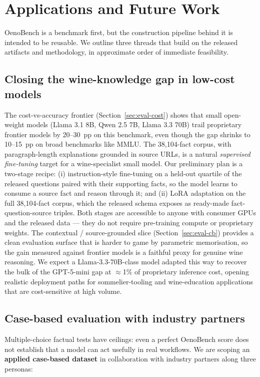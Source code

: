 \section{Applications and Future Work}
\label{sec:future}

OenoBench is a benchmark first, but the construction pipeline behind it
is intended to be reusable. We outline three threads that build on the
released artifacts and methodology, in approximate order of immediate
feasibility.

\subsection{Closing the wine-knowledge gap in low-cost models}
The cost-vs-accuracy frontier (Section~\ref{sec:eval-cost}) shows that
small open-weight models (Llama 3.1 8B, Qwen 2.5 7B, Llama 3.3 70B)
trail proprietary frontier models by 20--30~pp on this benchmark, even
though the gap shrinks to 10--15~pp on broad benchmarks like MMLU. The
38{,}104-fact corpus, with paragraph-length explanations grounded in
source URLs, is a natural \emph{supervised fine-tuning} target for a
wine-specialist small model. Our preliminary plan is a two-stage
recipe: (i) instruction-style fine-tuning on a held-out quartile of
the released questions paired with their supporting facts, so the
model learns to consume a source fact and reason through it; and (ii)
LoRA adaptation on the full 38{,}104-fact corpus, which the released
schema exposes as ready-made fact-question-source triples. Both
stages are accessible to anyone with consumer GPUs and the released
data --- they do not require pre-training compute or proprietary
weights. The contextual / source-grounded slice
(Section~\ref{sec:eval-cb}) provides a clean evaluation surface that
is harder to game by parametric memorisation, so the gain measured
against frontier models is a faithful proxy for genuine wine
reasoning. We expect a Llama-3.3-70B-class model adapted this way to
recover the bulk of the GPT-5-mini gap at $\approx$1\% of proprietary
inference cost, opening realistic deployment paths for
sommelier-tooling and wine-education applications that are
cost-sensitive at high volume.

\subsection{Case-based evaluation with industry partners}
Multiple-choice factual tests have ceilings: even a perfect
OenoBench score does not establish that a model can act usefully in
real workflows. We are scoping an \textbf{applied case-based dataset}
in collaboration with industry partners along three personas:

